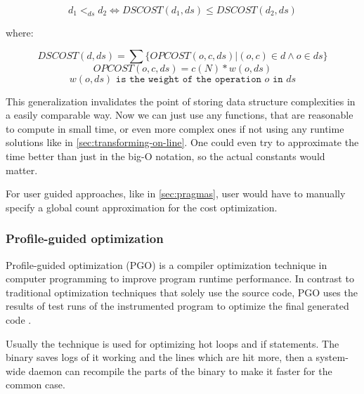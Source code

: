 \documentclass[a4paper,11pt]{article}
\begin{document}
            \begin{equation} \label{data-structure-order-weights}
                d_1 <_{ds} d_2 \Leftrightarrow DSCOST(d_1, ds) \leq DSCOST(d_2, ds)
            \end{equation}

            where:

            \begin{equation}
                DSCOST(d,ds) = \sum \{OPCOST(o,c,ds) | (o,c) \in d \wedge o \in ds\}
            \end{equation}
            \begin{equation}
                OPCOST(o,c,ds) = c(N) * w(o, ds)
            \end{equation}
            \begin{equation}
                w(o, ds) \texttt{ is the weight of the operation } o \texttt{ in } ds
            \end{equation}

            This generalization invalidates the point of storing data structure complexities in a easily comparable way.
            Now we can just use any functions, that are reasonable to compute in small time, or even more complex ones
            if not using any runtime solutions like in \autoref{sec:transforming-on-line}. One could even try to
            approximate the time better than just in the big-O notation, so the actual constants would matter.

            For user guided approaches, like in \autoref{sec:pragmas}, user would have to manually specify a global
            count approximation for the cost optimization.

		\subsubsection{Profile-guided optimization} \label{sec:pgo}

			Profile-guided optimization (PGO) is a compiler optimization technique in computer programming
			to improve program runtime performance.  In contrast to traditional optimization techniques that
			solely use the source code, PGO uses the results of test runs of the instrumented program to
            optimize the final generated code \cite{Wipgo}.

            Usually the technique is used for optimizing hot loops and if statements. The binary saves logs of it
            working and the lines which are hit more, then a system-wide daemon can recompile the parts of the binary to
            make it faster for the common case.
\end{document}
